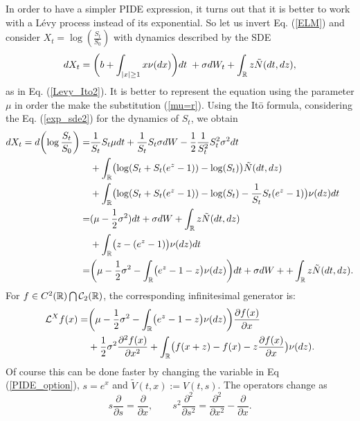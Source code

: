 In order to have a simpler PIDE expression, it turns out that it is better to work with a Lévy process instead of its exponential. So let us invert Eq. (\ref{ELM})
and consider $ X_t = \log \left( \frac{S_t}{S_0} \right)$ with dynamics described by the SDE 
\begin{equation}\label{SDE_log_var}
 dX_t = \biggl( b + \int_{|x|\geq 1}x \nu(dx) \biggr) dt \; + \sigma dW_t + \int_{\mathbb{R}} z \tilde N(dt,dz),
\end{equation}
as in Eq. (\ref{Levy_Ito2}). It is better to represent the equation using the parameter $\mu$ in order the make the substitution (\ref{mu=r}). Using the It\=o formula,
considering the Eq. (\ref{exp_sde2}) for the dynamics of $S_t$, we obtain
\begin{align*}
 dX_t = d\biggl( \log \frac{S_t}{S_0}\biggr) =& \frac{1}{S_t} S_t \mu dt + \frac{1}{S_t} S_t \sigma dW - \frac{1}{2} \frac{1}{S_t^2} S_t^2 \sigma^2 dt \\
 &  + \int_{\mathbb{R}} \bigl( \log(S_t+S_t(e^z-1)) - \log(S_t) \bigr) \tilde N(dt,dz) \\
 &  + \int_{\mathbb{R}} \bigl( \log(S_t+S_t(e^z-1)) - \log(S_t) -\frac{1}{S_t} S_t (e^z-1) \bigr) \nu(dz)dt \\
 =& (\mu-\frac{1}{2}\sigma^2)dt + \sigma dW + \int_{\mathbb{R}} z \tilde N(dt,dz) \\
 &  + \int_{\mathbb{R}} \bigl( z - (e^z-1) \bigr) \nu(dz) dt \\
 =& \biggl( \mu-\frac{1}{2}\sigma^2 - \int_{\mathbb{R}} \bigl( e^z-1-z \bigr) \nu(dz) \biggr)dt + \sigma dW + + \int_{\mathbb{R}} z \tilde N(dt,dz).
\end{align*}
For $f \in C^{2}(\mathbb{R}) \bigcap \mathcal{C}_2(\mathbb{R})$, the corresponding infinitesimal generator is:
\begin{align}\label{RN_log_gen}
 \mathcal{L}^X f(x) =& \biggl( \mu-\frac{1}{2}\sigma^2 - \int_{\mathbb{R}} \bigl( e^z-1-z \bigr) \nu(dz) \biggr) \frac{\partial f(x)}{\partial x} \\ \nonumber
          &+ \frac{1}{2} \sigma^2 \frac{\partial^2 f(x)}{\partial x^2} 
          + \int_{\mathbb{R}} \bigl( f(x+z)- f(x) - z \frac{\partial f(x)}{\partial x} \bigr) \nu(dz).
\end{align}
Of course this can be done faster by changing the variable in Eq (\ref{PIDE_option}), $s = e^x$ and $\tilde V(t,x) := V(t,s)$. The operators change as
\begin{equation}\label{log_var}
s \frac{\partial}{\partial s} = \frac{\partial}{\partial x}, \hspace{2em} 
s^2 \frac{\partial^2}{\partial s^2} = \frac{\partial^2}{\partial x^2} - \frac{\partial}{\partial x} . 
\end{equation}
